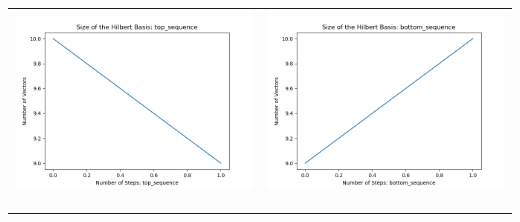 \documentclass[10pt]{article}
\begin{document}
\begin{tabular}{c|c}
\begin{minipage}{.45\textwidth}
\includegraphics[width=\textwidth]{"DATA/5d/6 generators 1 bound D/top_sequence SIZE"}
\end{minipage} &
\begin{minipage}{.45\textwidth}
\includegraphics[width=\textwidth]{"DATA/5d/6 generators 1 bound D bottomup/bottom_sequence SIZE"}
\end{minipage} \\ \\
\hline \\\begin{minipage}{.45\textwidth}

\end{minipage}
\end{tabular}
\end{document}
